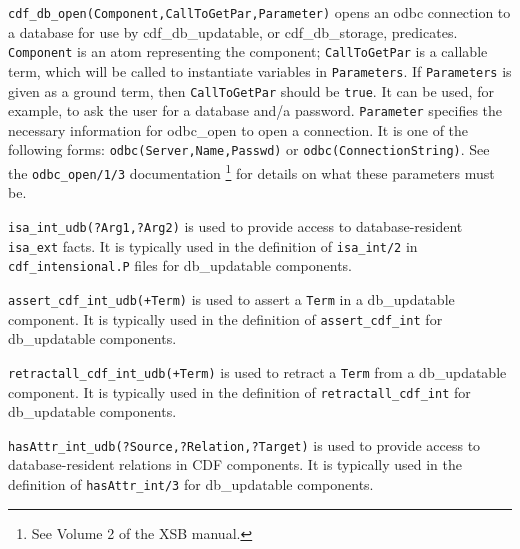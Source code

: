 \begin{description}
{\tt cdf\_db\_open(Component,CallToGetPar,Parameter)} opens an odbc
connection to a database for use by cdf\_db\_updatable, or
cdf\_db\_storage, predicates.  {\tt Component} is an atom representing the
component; {\tt CallToGetPar} is a callable term, which will be called
to instantiate variables in {\tt Parameters}.  If {\tt Parameters} is
given as a ground term, then {\tt CallToGetPar} should be {\tt true}.
It can be used, for example, to ask the user for a database and/a
password.  {\tt Parameter} specifies the necessary information for
odbc\_open to open a connection.  It is one of the following forms:
{\tt odbc(Server,Name,Passwd)} or {\tt odbc(ConnectionString)}.  See the
{\tt odbc\_open/1/3} documentation \footnote{See Volume 2 of the XSB
manual.}  for details on what these parameters must be.  

 {\tt isa\_int\_udb(?Arg1,?Arg2)} is used to
provide access to database-resident {\tt isa\_ext} facts. It is
typically used in the definition of {\tt isa\_int/2} in
{\tt cdf\_intensional.P} files for db\_updatable components.

{\tt assert\_cdf\_int\_udb(+Term)} is used to assert a {\tt Term} in a
db\_updatable component. It is typically used in the definition of
{\tt assert\_cdf\_int} for db\_updatable components.

{\tt retractall\_cdf\_int\_udb(+Term)} is used to retract a {\tt Term}
from a db\_updatable component. It is typically used in the definition
of {\tt retractall\_cdf\_int} for db\_updatable components.

{\tt hasAttr\_int\_udb(?Source,?Relation,?Target)} is used to provide
access to database-resident relations in CDF components. It is
typically used in the definition of {\tt hasAttr\_int/3} for
db\_updatable components.

\end{description}